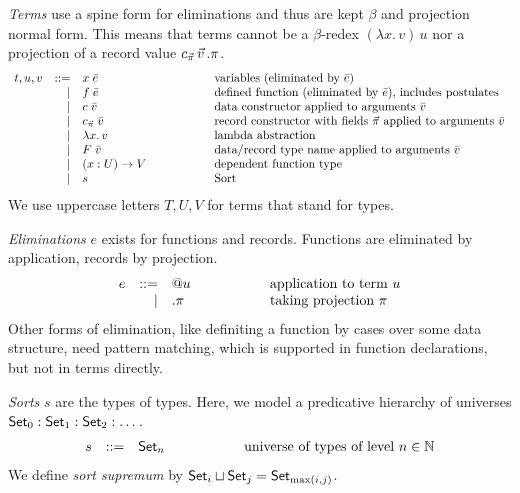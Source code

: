 \documentclass[acmlarge,fleqn]{acmart}\settopmatter{}
\begin{document}
\emph{Terms} use a spine form for eliminations and thus are kept $\beta$ and
projection normal form.  This means that terms cannot be a
$\beta$-redex $(\lambda x.\,v)\,u$ nor a projection of a record value
$c_{\vec\pi}\,\vec v\,.\pi$.
\[
\begin{array}{lrl@{\hspace{2cm}}l}
t, u, v
  &::=& x\; \bar{e}      & \text{variables (eliminated by $\bar{e}$)} \\
  & | & f\; \bar{e}      & \text{defined function (eliminated by $\bar{e}$), includes postulates} \\
  & | & c\; \bar{v}      & \text{data constructor applied to arguments $\bar{v}$} \\
  & | & \cpi\; \bar{v}   & \text{record constructor with fields $\vec\pi$ applied to arguments $\bar{v}$} \\
  & | & \lambda x.\, v   & \text{lambda abstraction} \\
  & | & F\; \bar{v}      & \text{data/record type name applied to arguments $\bar v$} \\
  & | & \funT x U V      & \text{dependent function type} \\
  & | & s                & \text{Sort} \\
\end{array}
\]
We use uppercase letters $T,U,V$ for terms that stand for types.

\emph{Eliminations} $e$ exists for functions and records.
Functions are eliminated by application, records by projection.
\[
\begin{array}{lrl@{\hspace{2cm}}l}
e &::=& @u               & \text{application to term $u$} \\
  & | & .\pi             & \text{taking projection $\pi$} \\
\end{array}
\]
Other forms of elimination, like definiting a function by cases over
some data structure, need pattern matching, which is supported in
function declarations, but not in terms directly.

\emph{Sorts} $s$ are the types of types.
Here, we model a predicative hierarchy of universes $\mathsf{Set}_0 : \mathsf{Set}_1 : \mathsf{Set}_2 : \dots$.
\[
\begin{array}{lrl@{\hspace{2cm}}l}
s & ::= & \Set_n         &  \text{universe of types of level $n \in \NN$} \\
\end{array}
\]
We define \emph{sort supremum}  by $\mathsf{Set}_i \sqcup \mathsf{Set}_j = \mathsf{Set}_{\max(i,j)}$.
\end{document}
